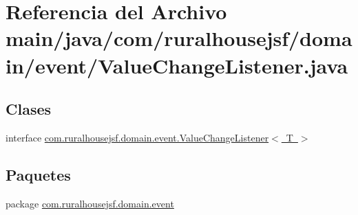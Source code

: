 \hypertarget{a00038}{}\section{Referencia del Archivo main/java/com/ruralhousejsf/domain/event/\+Value\+Change\+Listener.java}
\label{a00038}
\subsection*{Clases}
\begin{DoxyCompactItemize}
\item 
interface \mbox{\hyperlink{a00176}{com.\+ruralhousejsf.\+domain.\+event.\+Value\+Change\+Listener$<$ T $>$}}
\end{DoxyCompactItemize}
\subsection*{Paquetes}
\begin{DoxyCompactItemize}
\item 
package \mbox{\hyperlink{a00115}{com.\+ruralhousejsf.\+domain.\+event}}
\end{DoxyCompactItemize}
